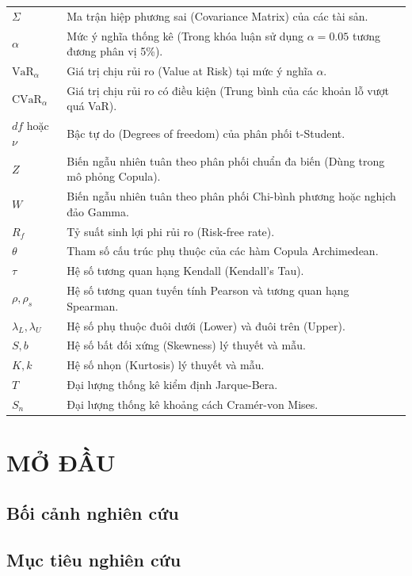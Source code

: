 \documentclass[a4paper,12pt]{article}
\begin{document}
\begin{longtable}{@{} p{2.5cm} p{12.5cm} @{}}
    $\Sigma$ & Ma trận hiệp phương sai (Covariance Matrix) của các tài sản. \\
    $\alpha$ & Mức ý nghĩa thống kê (Trong khóa luận sử dụng $\alpha = 0.05$ tương đương phân vị 5\%). \\
    $\text{VaR}_{\alpha}$ & Giá trị chịu rủi ro (Value at Risk) tại mức ý nghĩa $\alpha$. \\
    $\text{CVaR}_{\alpha}$ & Giá trị chịu rủi ro có điều kiện (Trung bình của các khoản lỗ vượt quá VaR). \\
    $df$ hoặc $\nu$ & Bậc tự do (Degrees of freedom) của phân phối t-Student. \\
    $Z$ & Biến ngẫu nhiên tuân theo phân phối chuẩn đa biến (Dùng trong mô phỏng Copula). \\
    $W$ & Biến ngẫu nhiên tuân theo phân phối Chi-bình phương hoặc nghịch đảo Gamma. \\
    $R_f$ & Tỷ suất sinh lợi phi rủi ro (Risk-free rate). \\
    $\theta$ & Tham số cấu trúc phụ thuộc của các hàm Copula Archimedean. \\
    $\tau$ & Hệ số tương quan hạng Kendall (Kendall's Tau). \\
    $\rho, \rho_s$ & Hệ số tương quan tuyến tính Pearson và tương quan hạng Spearman. \\
    $\lambda_L, \lambda_U$ & Hệ số phụ thuộc đuôi dưới (Lower) và đuôi trên (Upper). \\ 
    $S, b$ & Hệ số bất đối xứng (Skewness) lý thuyết và mẫu. \\
    $K, k$ & Hệ số nhọn (Kurtosis) lý thuyết và mẫu. \\
    $T$ & Đại lượng thống kê kiểm định Jarque-Bera. \\
    $S_n$ & Đại lượng thống kê khoảng cách Cramér-von Mises. \\
\end{longtable}


\newpage

\newpage
\setcounter{table}{0}
\section{MỞ ĐẦU}
\subsection{Bối cảnh nghiên cứu}

\subsection{Mục tiêu nghiên cứu}

\end{document}

